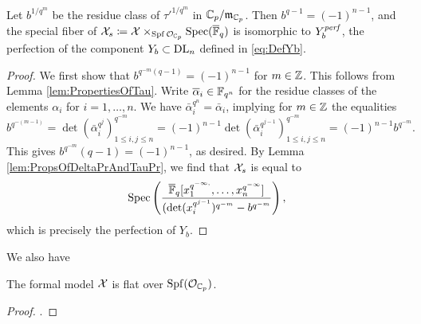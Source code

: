 \documentclass[../main.tex]{subfiles}
\begin{document}
\begin{prop}\label{prop:SpecialFiberOfAffinoidIsLusztig}
  Let $b^{1/q^m}$ be the residue class of $\tau'^{1/q^m}$ in ${\mathbb{C}_p}/\mathfrak{m}_{{\mathbb{C}_p}}$. 
  Then $b^{q-1} = (-1)^{n-1}$, and the special fiber of $\mathcal{X}_s \coloneq \mathcal{X}
  \times_{\operatorname{Spf} \mathcal{O}_{\mathbb{C}_p}} \operatorname{Spec} ({\overline {\mathbb{F}}_q})$ is isomorphic to $Y_b^{\mathit{perf}}$, the
  perfection of the component $Y_b \subset \mathrm{DL}_n$ defined in \eqref{eq:DefYb}.
\begin{proof}
  We first show that $b^{q^{-m}(q-1)} = (-1)^{n-1}$ for $m \in \mathbb{Z}$. 
  This follows from Lemma \ref{lem:PropertiesOfTau}. 
  Write $\overline \alpha_i \in \mathbb{F}_{q^n}$ for the residue classes of the 
  elements $\alpha_i$ for $i = 1, \dots, n$. We have $\bar \alpha_i^{q^n}
  = \bar \alpha_i$, implying for $m \in \mathbb{Z}$ the equalities
  \begin{equation*}
    b^{q^{-(m-1)}} = \det(\bar \alpha_i^{q^j})_{1 \leq i,j \leq n}^{q^{-m}} =
    (-1)^{n-1} \det (\bar \alpha_i^{q^{j-1}})_{1 \leq i,j \leq n}^{q^{-m}} =
    (-1)^{n-1} b^{q^{-m}}.
  \end{equation*}
  This gives $b^{q^{-m}}(q-1) = (-1)^{n-1}$, as desired.
  By Lemma \ref{lem:PropsOfDeltaPrAndTauPr}, we find that $\mathcal{X}_s$ is equal to
  \begin{equation*}
    \operatorname{Spec} \left( \frac{{\overline {\mathbb{F}}_q} [x_1^{q^{-\infty,}}, \dots,
    x_n^{q^{-\infty}}]}{(\det(x_i^{q^{j-1}})^{q^{-m}}- b^{q^{-m}}} \right),
  \end{equation*}
  which is precisely the perfection of $Y_b$.
\end{proof}
\end{prop}

We also have
\begin{prop}\label{prop:FlatnessOfFormalModel}
  The formal model $\mathcal{X}$ is flat over $\operatorname{Spf}(\mathcal{O}_{\mathbb{C}_p})$. 
\begin{proof}
  .
\end{proof}
\end{prop}


\end{document}
